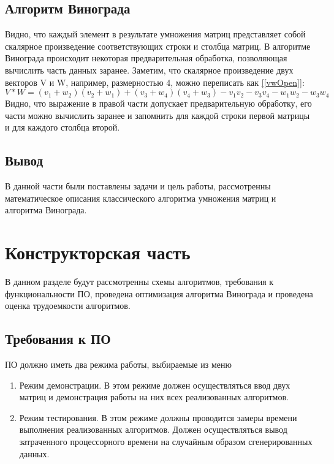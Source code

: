 \documentclass{article}
\begin{document}
		\subsection{Алгоритм Винограда}
		Видно, что каждый элемент в результате умножения матриц представляет собой скалярное произведение соответствующих строки и столбца матриц. В алгоритме Винограда происходит некоторая предварительная обработка, позволяющая вычислить часть данных заранее. Заметим, что скалярное произведение двух векторов V и W, например, размерностью 4, можно переписать как \hyperref[vwOpen]{[\ref{vwOpen}]}:
		\begin{equation}\label{vwOpen}
		V * W = (v_{1} + w_{2})(v_{2} + w_{1}) + (v_{3} + w_{4})(v_{4} + w_{3}) -  v_{1}v_{2} - v_{3}v_{4} - w_{1}w_{2} - w_{3}w_{4}
	\end{equation}
	\indent Видно, что выражение в правой части допускает предварительную обработку, его части можно вычислить заранее и запомнить для каждой строки первой матрицы и для каждого столбца второй.\cite{vinogradRef}
	\subsection{Вывод}
	В данной части были поставлены задачи и цель работы, рассмотренны математическое описания классического алгоритма умножения матриц и алгоритма Винограда.
		
	\newpage
	\section{Конструкторская часть}
		В данном разделе будут рассмотренны схемы алгоритмов, требования к функциональности ПО, проведена оптимизация алгоритма Винограда и проведена оценка трудоемкости алгоритмов.
		\subsection{Требования к ПО} 
		ПО должно иметь два режима работы, выбираемые из меню
		\begin{enumerate}
			\item Режим демонстрации. В этом режиме должен осуществляться ввод двух матриц и демонстрация работы на них всех реализованных алгоритмов.
		 	\item Режим тестирования. В этом режиме должны проводится замеры времени выполнения реализованных алгоритмов. Должен осуществляться вывод затраченного процессорного времени на случайным образом сгенерированных данных.
	 	\end{enumerate}
\end{document}
